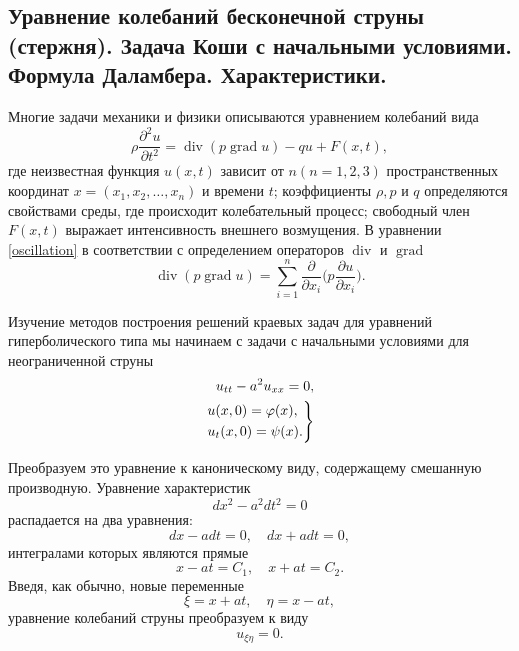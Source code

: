 \subsection{Уравнение колебаний бесконечной струны (стержня). Задача Коши с начальными условиями. Формула Даламбера. Характеристики.}


Многие задачи механики и физики описываются уравнением колебаний вида 
\begin{equation} \label{oscillation}
	\rho \frac{\partial^2 u}{\partial t^2} = \operatorname{div}(p \operatorname{grad}{u}) - q u + F(x, t),
\end{equation}
где неизвестная функция $ u(x, t) $ зависит от $ n (n = 1, 2, 3)$ пространственных координат $x = (x_1, x_2, \dotsc, x_n)$ и времени $t$; коэффициенты $\rho, p$ и $q$ определяются свойствами среды, где происходит колебательный процесс; свободный член $F(x, t)$ выражает интенсивность внешнего возмущения. В уравнении \eqref{oscillation} в соответствии с определением операторов $\operatorname{div}$ и $\operatorname{grad}$
\begin{equation*}
	\operatorname{div}(p\operatorname{grad} u) = \sum \limits_{i = 1}^{n} \frac{\partial}{\partial x_i} \Big(p \frac{\partial u}{\partial x_i}\Big).
\end{equation*}

Изучение методов построения решений краевых задач для уравнений гиперболического типа мы начинаем с задачи с начальными условиями для неограниченной струны 
\begin{align}
	u_{tt} - a^2 u_{xx} = 0, \label{infinite_string} \\
	\begin{rcases}
		u(x, 0) = \varphi(x), \\
		u_t(x, 0) = \psi(x).
	\end{rcases} \label{inf_str_cond}
\end{align}

Преобразуем это уравнение к каноническому виду, содержащему смешанную производную. Уравнение характеристик 
\begin{equation*}
	d x^2 - a^2 d t^2 = 0 
\end{equation*}
распадается на два уравнения:
\begin{equation*}
	d x - a dt = 0, \quad d x + a dt = 0,
\end{equation*}
интегралами которых являются прямые 
\begin{equation*}
	x - a t = C_1, \quad x + a t = C_2.
\end{equation*}
Введя, как обычно, новые переменные
\begin{equation}
	\xi = x + a t, \quad \eta = x - a t,
\end{equation}
уравнение колебаний струны преобразуем к виду
\begin{equation} \label{homo_oscil}
	u_{\xi \eta} = 0.
\end{equation}

